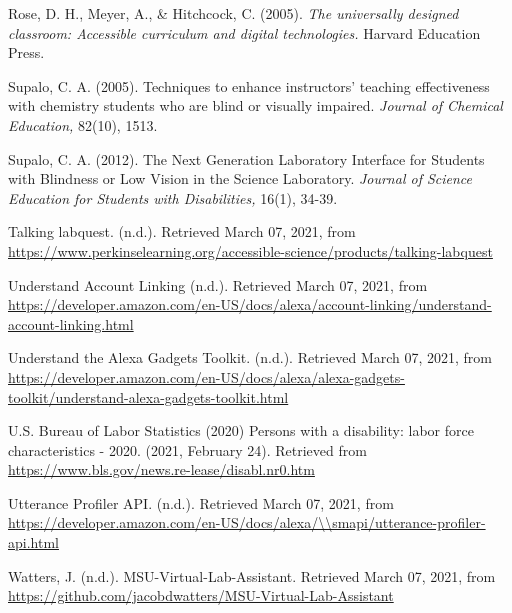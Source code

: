 \documentclass[11.5pt]{sig-alternate} %
\begin{document}
Rose, D. H., Meyer, A., \& Hitchcock, C. (2005). \textit{The universally designed classroom: Accessible curriculum and digital technologies.} Harvard Education Press.

Supalo, C. A. (2005). Techniques to enhance instructors' teaching effectiveness with chemistry students who are blind or visually impaired. \textit{Journal of Chemical Education,} 82(10), 1513.

Supalo, C. A. (2012). The Next Generation Laboratory Interface for Students with Blindness or Low Vision in the Science Laboratory. \textit{Journal of Science Education for Students with Disabilities,} 16(1), 34-39.

Talking labquest. (n.d.). Retrieved March 07, 2021, from \url{https://www.perkinselearning.org/accessible-science/products/talking-labquest}

Understand Account Linking (n.d.). Retrieved March 07, 2021, from \url{https://developer.amazon.com/en-US/docs/alexa/account-linking/understand-account-linking.html}

Understand the Alexa Gadgets Toolkit. (n.d.). Retrieved March 07, 2021, from \url{https://developer.amazon.com/en-US/docs/alexa/alexa-gadgets-toolkit/understand-alexa-gadgets-toolkit.html}

U.S. Bureau of Labor Statistics (2020) Persons with a disability: labor force characteristics - 2020. (2021, February 24). Retrieved from \url{https://www.bls.gov/news.re-lease/disabl.nr0.htm}

Utterance Profiler API. (n.d.). Retrieved March 07, 2021, from \url{https://developer.amazon.com/en-US/docs/alexa/\\smapi/utterance-profiler-api.html}

Watters, J. (n.d.). MSU-Virtual-Lab-Assistant. Retrieved March 07, 2021, from \url{https://github.com/jacobdwatters/MSU-Virtual-Lab-Assistant}
\end{document}
